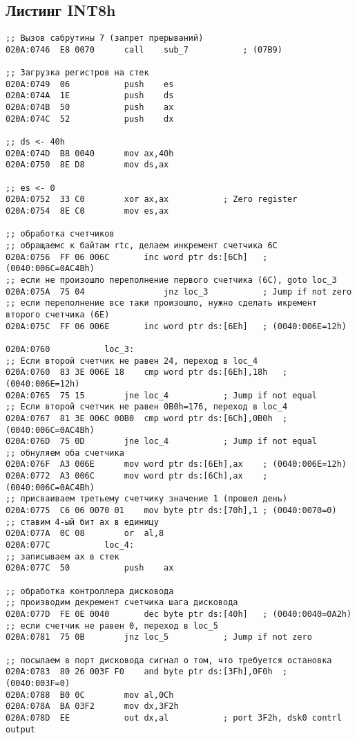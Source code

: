 \subsection*{Листинг INT8h} 
\begin{lstlisting}[style={asm}]
;; Вызов сабрутины 7 (запрет прерываний)
020A:0746  E8 0070		call	sub_7			; (07B9)

;; Загрузка регистров на стек
020A:0749  06			push	es
020A:074A  1E			push	ds
020A:074B  50			push	ax
020A:074C  52			push	dx

;; ds <- 40h
020A:074D  B8 0040		mov	ax,40h
020A:0750  8E D8		mov	ds,ax

;; es <- 0
020A:0752  33 C0		xor	ax,ax			; Zero register
020A:0754  8E C0		mov	es,ax

;; обработка счетчиков
;; обращаемс к байтам rtc, делаем инкремент счетчика 6C
020A:0756  FF 06 006C		inc	word ptr ds:[6Ch]	; (0040:006C=0AC4Bh)
;; если не произошло переполнение первого счетчика (6C), goto loc_3
020A:075A  75 04				jnz	loc_3			; Jump if not zero
;; если переполнение все таки произошло, нужно сделать икремент второго счетчика (6E)
020A:075C  FF 06 006E		inc	word ptr ds:[6Eh]	; (0040:006E=12h)

020A:0760			loc_3:
;; Если второй счетчик не равен 24, переход в loc_4
020A:0760  83 3E 006E 18	cmp	word ptr ds:[6Eh],18h	; (0040:006E=12h)
020A:0765  75 15		jne	loc_4			; Jump if not equal
;; Если второй счетчик не равен 0B0h=176, переход в loc_4
020A:0767  81 3E 006C 00B0	cmp	word ptr ds:[6Ch],0B0h	; (0040:006C=0AC4Bh)
020A:076D  75 0D		jne	loc_4			; Jump if not equal
;; обнуляем оба счетчика
020A:076F  A3 006E		mov	word ptr ds:[6Eh],ax	; (0040:006E=12h)
020A:0772  A3 006C		mov	word ptr ds:[6Ch],ax	; (0040:006C=0AC4Bh)
;; присваиваем третьему счетчику значение 1 (прошел день)
020A:0775  C6 06 0070 01	mov	byte ptr ds:[70h],1	; (0040:0070=0)
;; ставим 4-ый бит ax в единицу
020A:077A  0C 08		or	al,8
020A:077C			loc_4:
;; записываем ax в стек
020A:077C  50			push	ax

;; обработка контроллера дисковода
;; производим декремент счетчика шага дисковода
020A:077D  FE 0E 0040		dec	byte ptr ds:[40h]	; (0040:0040=0A2h)
;; если счетчик не равен 0, переход в loc_5
020A:0781  75 0B		jnz	loc_5			; Jump if not zero

;; посылаем в порт дисковода сигнал о том, что требуется остановка
020A:0783  80 26 003F F0	and	byte ptr ds:[3Fh],0F0h	; (0040:003F=0)
020A:0788  B0 0C		mov	al,0Ch
020A:078A  BA 03F2		mov	dx,3F2h
020A:078D  EE			out	dx,al			; port 3F2h, dsk0 contrl output


\end{lstlisting}
